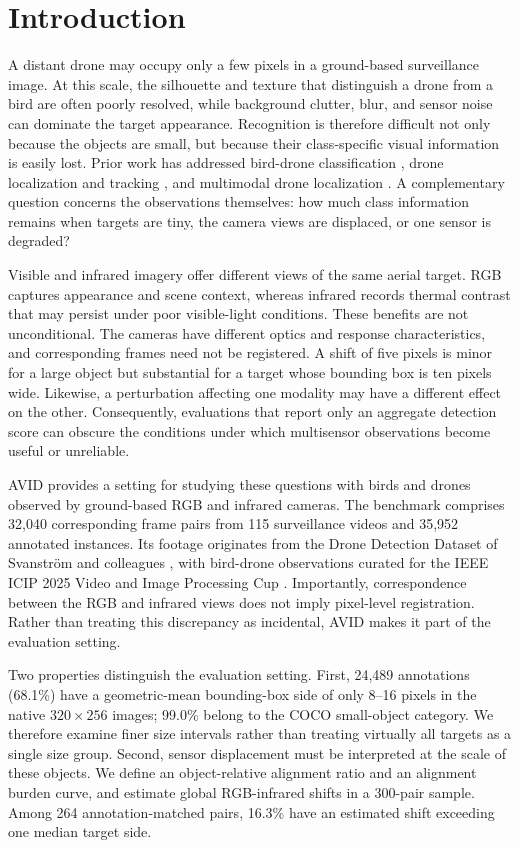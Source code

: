 \documentclass[10pt]{article}
\newcommand{\dataset}{\textsc{AVID}}
\begin{document}
\section{Introduction}

A distant drone may occupy only a few pixels in a ground-based surveillance image. At this scale, the silhouette and texture that distinguish a drone from a bird are often poorly resolved, while background clutter, blur, and sensor noise can dominate the target appearance. Recognition is therefore difficult not only because the objects are small, but because their class-specific visual information is easily lost. Prior work has addressed bird-drone classification \citep{selvi2022deep}, drone localization and tracking \citep{10193217,10328384}, and multimodal drone localization \citep{11700652}. A complementary question concerns the observations themselves: how much class information remains when targets are tiny, the camera views are displaced, or one sensor is degraded?

Visible and infrared imagery offer different views of the same aerial target. RGB captures appearance and scene context, whereas infrared records thermal contrast that may persist under poor visible-light conditions. These benefits are not unconditional. The cameras have different optics and response characteristics, and corresponding frames need not be registered. A shift of five pixels is minor for a large object but substantial for a target whose bounding box is ten pixels wide. Likewise, a perturbation affecting one modality may have a different effect on the other. Consequently, evaluations that report only an aggregate detection score can obscure the conditions under which multisensor observations become useful or unreliable.

\dataset{} provides a setting for studying these questions with birds and drones observed by ground-based RGB and infrared cameras. The benchmark comprises 32,040 corresponding frame pairs from 115 surveillance videos and 35,952 annotated instances. Its footage originates from the Drone Detection Dataset of Svanstr\"om and colleagues \citep{svanstrom2021multisensor,svanstrom2020repository}, with bird-drone observations curated for the IEEE ICIP 2025 Video and Image Processing Cup \citep{ieeevipcup2025}. Importantly, correspondence between the RGB and infrared views does not imply pixel-level registration. Rather than treating this discrepancy as incidental, \dataset{} makes it part of the evaluation setting.

Two properties distinguish the evaluation setting. First, 24,489 annotations (68.1\%) have a geometric-mean bounding-box side of only 8--16 pixels in the native $320\times256$ images; 99.0\% belong to the COCO small-object category. We therefore examine finer size intervals rather than treating virtually all targets as a single size group. Second, sensor displacement must be interpreted at the scale of these objects. We define an object-relative alignment ratio and an alignment burden curve, and estimate global RGB-infrared shifts in a 300-pair sample. Among 264 annotation-matched pairs, 16.3\% have an estimated shift exceeding one median target side.
\end{document}
